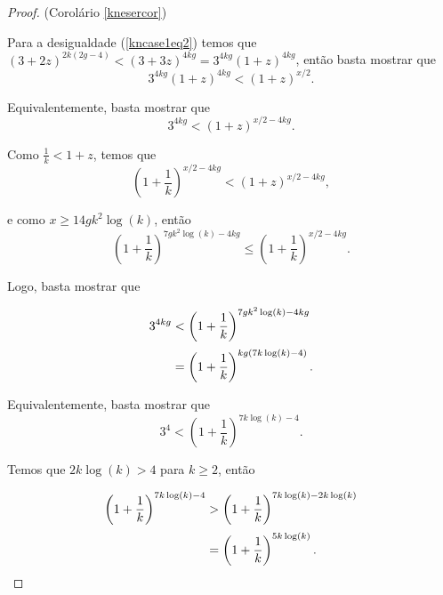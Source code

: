 \begin{proof}{(Corolário \ref{knesercor})}

Para a desigualdade (\ref{kncase1eq2}) temos que $(3+2z)^{2k(2g-4)} < (3+3z)^{4kg} = 3^{4kg}(1+z)^{4kg}$, então basta mostrar que \[3^{4kg}(1+z)^{4kg} < (1+z)^{x/2}.\]

Equivalentemente, basta mostrar que  \[3^{4kg} < (1+z)^{x/2 - 4kg}.\]

Como $\frac{1}{k} < 1+z$, temos que \[\left(1+\frac{1}{k}\right)^{x/2-4kg} < (1+z)^{x/2 - 4kg},\]

e como $x\geq 14gk^2\log(k)$, então \[\left(1+\frac{1}{k}\right)^{7gk^2\log(k) - 4kg} \leq \left(1+\frac{1}{k}\right)^{x/2-4kg}.\]

Logo, basta mostrar que

\begin{equation*}
\setlength{\jot}{5pt}
\begin{aligned}
3^{4kg} &<\left(1+\frac{1}{k}\right)^{7gk^2\log(k) - 4kg}\\
&= \left(1+\frac{1}{k}\right)^{kg(7k\log(k)-4)}.
\end{aligned}
\end{equation*}

Equivalentemente, basta mostrar que \[3^4 < \left(1+\frac{1}{k}\right)^{7k\log(k)-4}.\]



Temos que $2k\log(k) > 4$ para $k\geq 2$, então 

\begin{equation*}
\setlength{\jot}{5pt}
\begin{aligned}
\left(1+\frac{1}{k}\right)^{7k\log(k)-4} &> \left(1+\frac{1}{k}\right)^{7k\log(k)-2k\log(k)}\\
&= \left(1+\frac{1}{k}\right)^{5k\log(k)}.
\end{aligned}
\end{equation*}


\end{proof}
